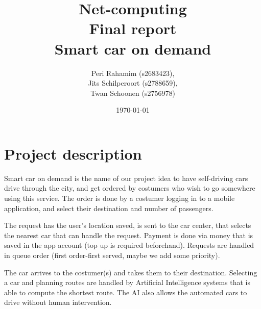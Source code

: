 \documentclass[a4paper]{article}
\begin{document}
\title{Net-computing\\
Final report\\
Smart car on demand
}

\date{\today}

\author{Peri Rahamim (s2683423),\\
Jits Schilperoort (s2788659),\\
Twan Schoonen (s2756978)
}


\maketitle
\section*{Project description}
Smart car on demand is the name of our project idea to have self-driving cars drive through the city, and get ordered by costumers who wish to go somewhere using this service. The order is done by a costumer logging in to a mobile application, and select their destination and number of passengers.

The request has the user's location saved, is sent to the car center, that selects the nearest car that can handle the request. Payment is done via money that is saved in the app account (top up is required beforehand). Requests are handled in queue order (first order-first served, maybe we add some priority).

The car arrives to the costumer(s) and takes them to their destination. Selecting a car and planning routes are handled by Artificial Intelligence systems that is able to compute the shortest route. The AI also allows the automated cars to drive without human intervention.
\end{document}
